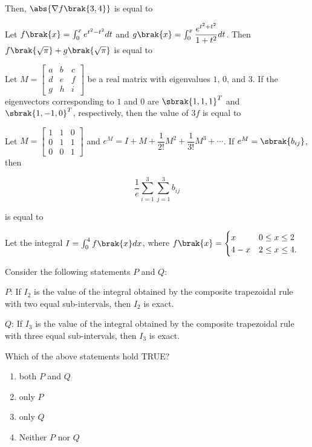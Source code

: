     Then, $\abs{\nabla f\brak{3,4}}$ is equal to \underline{\hspace{2cm}}

\item Let $f\brak{x} = \int_{0}^{x} e^{t^2 - t^2} dt$ and $g\brak{x} = \int_{0}^{x} \dfrac{e^{t^2 + t^2}}{1 + t^2} dt$. Then $f\brak{\sqrt{\pi}} + g\brak{\sqrt{\pi}}$ is equal to \underline{\hspace{2cm}}

\item Let $M = \begin{bmatrix}
        a & b & c \\
        d & e & f \\
        g & h & i
    \end{bmatrix}$ be a real matrix with eigenvalues $1$, $0$, and $3$. If the eigenvectors corresponding to $1$ and $0$ are $\sbrak{1,1,1}^T$ and $\sbrak{1,-1,0}^T$, respectively, then  
 the value of $3 f$ is equal to \underline{\hspace{2cm}}

\item Let $M = \begin{bmatrix}
        1 & 1 & 0 \\
        0 & 1 & 1 \\
        0 & 0 & 1
    \end{bmatrix}$ and $e^M = I + M + \dfrac{1}{2!} M^2 + \dfrac{1}{3!} M^3 + \cdots$. If $e^M = \sbrak{b_{ij}}$, then 

    $$\dfrac{1}{e} \sum_{i=1}^3 \sum_{j=1}^3 b_{ij}$$

    is equal to \underline{\hspace{2cm}}

\item Let the integral $I = \int_{0}^{4} f\brak{x} dx$, where $f\brak{x} = \begin{cases}
        x & 0 \leq x \leq 2 \\
        4 - x & 2 \leq x \leq 4.
    \end{cases}$

    Consider the following statements $P$ and $Q$:

    $P$: If $I_2$ is the value of the integral obtained by the composite trapezoidal rule with two equal sub-intervals, then  
 $I_2$ is exact.

    $Q$: If $I_3$ is the value of the integral obtained by the composite trapezoidal rule with three equal sub-intervals, then $I_3$ is exact.

    Which of the above statements hold TRUE?  

    \begin{enumerate}
        \item both $P$ and $Q$
        \item only $P$
        \item only $Q$
        \item Neither $P$ nor $Q$
    \end{enumerate}


